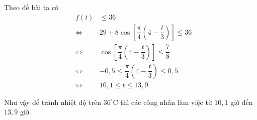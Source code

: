 \begin{bt}
{\begin{enumerate}
\begin{center}
	\end{center}
	Theo đề bài ta có
	\begin{eqnarray*} 
	 &f(t)& \leq 36 \\&\Leftrightarrow& 29 + 8\cos\left[\dfrac{\pi}{4}\left( 4-\dfrac{t}{3}\right) \right] \leq 36\\ &\Leftrightarrow & \cos\left[\dfrac{\pi}{4}\left( 4-\dfrac{t}{3}\right) \right] \leq \dfrac{7}{8}\\& \Leftrightarrow& -0{,}5  \leq \dfrac{\pi}{4}\left( 4-\dfrac{t}{3}\right) \leq 0{,}5\\& \Leftrightarrow& 10{,}1 \leq t \leq 13{,}9.
	 \end{eqnarray*}
	\end{enumerate}

	Như vậy để tránh nhiệt độ trên $36^\circ$C thì các công nhân làm việc từ $10{,1}$ giờ đến $13{,}9$ giờ.
	}
\end{bt}


